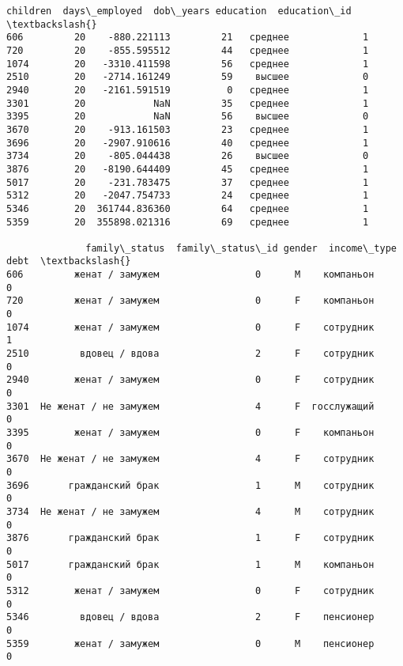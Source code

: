 \documentclass[11pt]{article}
\begin{document}
    \begin{Verbatim}[commandchars=\\\{\}]
      children  days\_employed  dob\_years education  education\_id  \textbackslash{}
606         20    -880.221113         21   среднее             1
720         20    -855.595512         44   среднее             1
1074        20   -3310.411598         56   среднее             1
2510        20   -2714.161249         59    высшее             0
2940        20   -2161.591519          0   среднее             1
3301        20            NaN         35   среднее             1
3395        20            NaN         56    высшее             0
3670        20    -913.161503         23   среднее             1
3696        20   -2907.910616         40   среднее             1
3734        20    -805.044438         26    высшее             0
3876        20   -8190.644409         45   среднее             1
5017        20    -231.783475         37   среднее             1
5312        20   -2047.754733         24   среднее             1
5346        20  361744.836360         64   среднее             1
5359        20  355898.021316         69   среднее             1

              family\_status  family\_status\_id gender  income\_type  debt  \textbackslash{}
606         женат / замужем                 0      M    компаньон     0
720         женат / замужем                 0      F    компаньон     0
1074        женат / замужем                 0      F    сотрудник     1
2510         вдовец / вдова                 2      F    сотрудник     0
2940        женат / замужем                 0      F    сотрудник     0
3301  Не женат / не замужем                 4      F  госслужащий     0
3395        женат / замужем                 0      F    компаньон     0
3670  Не женат / не замужем                 4      F    сотрудник     0
3696       гражданский брак                 1      M    сотрудник     0
3734  Не женат / не замужем                 4      M    сотрудник     0
3876       гражданский брак                 1      F    сотрудник     0
5017       гражданский брак                 1      M    компаньон     0
5312        женат / замужем                 0      F    сотрудник     0
5346         вдовец / вдова                 2      F    пенсионер     0
5359        женат / замужем                 0      M    пенсионер     0


\end{Verbatim}
\end{document}
